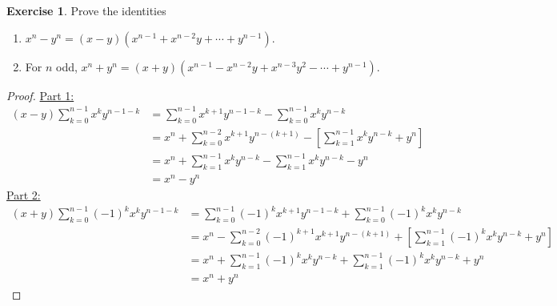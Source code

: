 \documentclass{article}
\theoremstyle{definition}
\newtheorem{exercise}{Exercise}
\begin{document}
\begin{exercise} \label{c1-ex-24}
Prove the identities
\begin{enumerate}
	\item $x^n - y^n = (x - y)(x^{n - 1} + x^{n - 2} y + \cdots + y^{n - 1})$.
	\item For $n$ odd, $x^n + y^n = (x + y) (x^{n - 1} - x^{n - 2} y + x^{n - 3} y^2 - \cdots + y^{n - 1})$.
\end{enumerate}
\end{exercise}
\begin{proof}
\underline{Part 1:}
\begin{align*}
(x - y) \sum_{k = 0}^{n - 1} x^k y^{n - 1 - k} & = \sum_{k = 0}^{n - 1} x^{k + 1} y^{n - 1 - k} - \sum_{k = 0}^{n - 1} x^k y^{n - k} \\
& = x^n + \sum_{k = 0}^{n - 2} x^{k + 1} y^{n - (k + 1)} - \left[ \sum_{k = 1}^{n - 1} x^k y^{n - k} + y^n \right] \\
& = x^n + \sum_{k = 1}^{n - 1} x^k y^{n - k} - \sum_{k = 1}^{n - 1} x^k y^{n - k} - y^n \\
& = x^n - y^n
\end{align*}
\underline{Part 2:}
\begin{align*}
(x + y) \sum_{k = 0}^{n - 1} (-1)^k x^k y^{n - 1 - k} & = \sum_{k = 0}^{n - 1} (-1)^k x^{k + 1} y^{n - 1 - k} + \sum_{k = 0}^{n - 1} (-1)^k x^k y^{n - k} \\
& = x^n - \sum_{k = 0}^{n - 2} (-1)^{k + 1} x^{k + 1} y^{n - (k + 1)} + \left[ \sum_{k = 1}^{n - 1} (-1)^k x^k y^{n - k} + y^n \right] \\
& = x^n + \sum_{k = 1}^{n - 1} (-1)^k x^k y^{n - k} + \sum_{k = 1}^{n - 1} (-1)^k x^k y^{n - k} + y^n \\
& = x^n + y^n
\end{align*}
\end{proof}

\newpage
\end{document}
